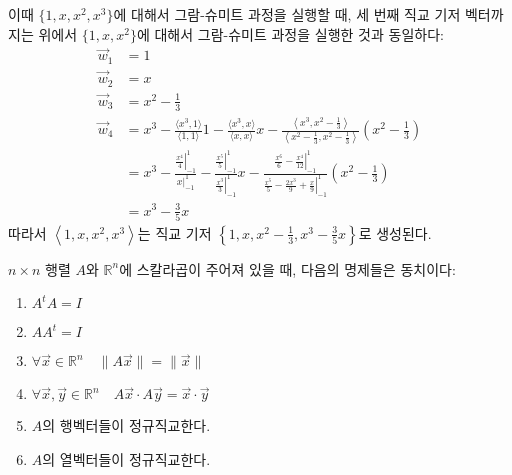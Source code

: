\documentclass[sections/engineering_mathematics_lecture_note.tex]{subfiles}
\begin{document}
\begin{example}
\begin{enumerate}
            이때 $\{1, x, x^2, x^3\}$에 대해서 그람-슈미트 과정을 실행할 때, 세 번째 직교 기저 벡터까지는 위에서 $\{1, x, x^2\}$에 대해서 그람-슈미트 과정을 실행한 것과 동일하다:
            \begin{align*}
                \vec w_1 &= 1\\
                \vec w_2 &= x\\
                \vec w_3 &= x^2 - \frac13\\
                \vec w_4 &= x^3 - \frac{\langle x^3, 1 \rangle}{\langle 1, 1\rangle} 1 - \frac{\langle x^3, x\rangle}{\langle x, x \rangle} x - \frac{\left\langle x^3, x^2 - \frac13\right\rangle}{\left\langle x^2 - \frac13, x^2 - \frac13 \right\rangle} \left(x^2 - \frac13\right)\\
                         &= x^3 - \frac{\left.\frac{x^4}{4}\right|_{-1}^1}{\left. x \right|_{-1}^1} - \frac{\left. \frac{x^5}{5} \right|_{-1}^1}{\left. \frac{x^3}{3} \right|_{-1}^1} x - \frac{\left. \frac{x^6}{6} - \frac{x^4}{12} \right|_{-1}^1}{\left. \frac{x^5}{5} - \frac{2x^3}{9} + \frac x9 \right|_{-1}^1}\left(x^2 - \frac13\right)\\
                         &= x^3 - \frac{3}{5}x
            \end{align*}
            따라서 $\left< 1, x, x^2, x^3 \right>$는 직교 기저 $\left\{1, x, x^2 - \frac13, x^3 - \frac{3}{5}x\right\}$로 생성된다.
    \end{enumerate}
\end{example}

\begin{theorem} \label{thm:orthogonal_mat}
    $n \times n$ 행렬 $A$와 $\mathbb R^n$에 스칼라곱이 주어져 있을 때, 다음의 명제들은 동치이다:
    \begin{enumerate}
        \item $A^t A = I$
        \item $A A^t = I$
        \item $\forall \vec x \in \mathbb R^n \quad \lVert A \vec x \rVert = \lVert \vec x \rVert$
        \item $\forall \vec x, \vec y \in \mathbb R^n \quad A \vec x \cdot A \vec y = \vec x \cdot \vec y$
        \item $A$의 행벡터들이 정규직교한다.
        \item $A$의 열벡터들이 정규직교한다.
    \end{enumerate}
\end{theorem}
\end{document}
